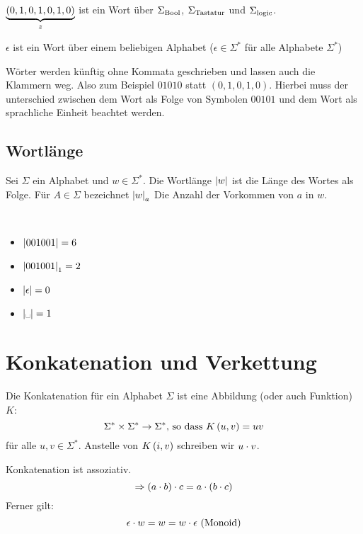 \begin{example}
$\underbrace{(0, 1, 0, 1, 0, 1, 0)}_{z}$ ist ein Wort über $\Sigma_{\text{Bool}}$, $\Sigma_{\text{Tastatur}}$ und $\Sigma_{\text{logic}}$.
\end{example}

$\epsilon$ ist ein Wort über einem beliebigen Alphabet ($\epsilon \in \Sigma^*$ für alle Alphabete $\Sigma^*$)

\begin{notation}
Wörter werden künftig ohne Kommata geschrieben und lassen auch die Klammern weg. Also zum Beispiel $01010$ statt $(0, 1, 0, 1 , 0)$. Hierbei muss der unterschied zwischen dem Wort als Folge von Symbolen $00101$ und dem Wort als sprachliche Einheit  beachtet werden.
\end{notation}

\subsection{Wortlänge}
\begin{definition}[Wortlänge]
Sei $\Sigma$ ein Alphabet und $w \in \Sigma^*$. Die Wortlänge $\left|w\right|$ ist die Länge des Wortes als Folge. Für $A \in \Sigma$ bezeichnet $\left|w\right|_a$ Die Anzahl der Vorkommen von $a$ in $w$.
\end{definition}

\begin{example}~
\begin{itemize}
\item $\left|001001\right| = 6$
\item $\left|001001\right|_1 = 2$
\item $\left|\epsilon\right| = 0$
\item $\btg{\tx{\textvisiblespace}} = 1$
\end{itemize}
\end{example}

\section{Konkatenation und Verkettung}
\begin{definition}
Die Konkatenation für ein Alphabet $\Sigma$ ist eine Abbildung (oder auch Funktion) $K$:
\[\Sigma^* \times \Sigma^* \rightarrow \Sigma^* \text{, so dass } K \left(u, v\right) = uv\]
für alle $u, v \in \Sigma^*$. Anstelle von $K \left(i, v\right)$ schreiben wir $u \cdot v$.
\end{definition}

\begin{note}
Konkatenation ist assoziativ.
\[\Rightarrow \left(a \cdot b\right) \cdot c = a \cdot \left(b \cdot c\right)\]
Ferner gilt:
\[\epsilon \cdot w = w = w \cdot \epsilon \text{ (Monoid)}\]
\end{note}


